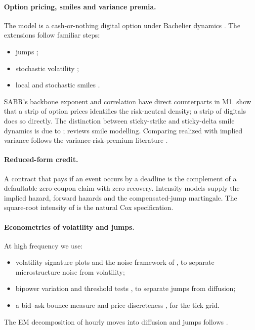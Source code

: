 \paragraph{Option pricing, smiles and variance premia.} The model is a cash-or-nothing digital
option under Bachelier dynamics
\citep{bachelier1900,blackscholes1973,merton1973}. The extensions follow familiar steps:
\begin{itemize}
  \item jumps \citep{merton1976};
  \item stochastic volatility \citep{heston1993};
  \item local and stochastic smiles \citep{dupire1994,hagan2002}.
\end{itemize}
SABR's backbone exponent and correlation have direct counterparts in M1.
\citet{breedenlitzenberger1978} show that a strip of option prices identifies the risk-neutral
density; a strip of digitals does so directly. The distinction between sticky-strike and
sticky-delta smile dynamics is due to \citet{derman1999}; \citet{gatheral2006} reviews smile
modelling. Comparing realized with implied variance follows the variance-risk-premium literature
\citep{carrwu2009,bollerslev2009}.

\paragraph{Reduced-form credit.} A contract that pays if an event occurs by a deadline is the
complement of a defaultable zero-coupon claim with zero recovery. Intensity models
\citep{jarrowturnbull1995,lando1998,duffiesingleton1999} supply the implied hazard, forward
hazards and the compensated-jump martingale. The square-root intensity of \citet{cox1985cir} is
the natural Cox specification.

\paragraph{Econometrics of volatility and jumps.} At high frequency we use:
\begin{itemize}
  \item volatility signature plots \citep{andersen2000signature} and the noise framework of
  \citet{zhang2005}, to separate microstructure noise from volatility;
  \item bipower variation \citep{barndorffnielsen2004} and threshold tests
  \citep{leemykland2008}, to separate jumps from diffusion;
  \item a bid--ask bounce measure \citep{roll1984} and price discreteness \citep{harris1991}, for
  the tick grid.
\end{itemize}
The EM decomposition of hourly moves into diffusion and jumps follows \citet{dempster1977}.
